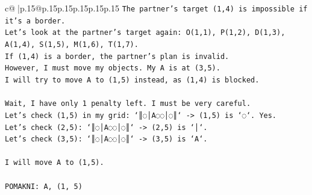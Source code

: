 \documentclass{article}
\begin{document}
{\begin{supertabular}{c@{$\;$}|p{.15\linewidth}@{}p{.15\linewidth}p{.15\linewidth}p{.15\linewidth}p{.15\linewidth}p{.15\linewidth}}
{{{\texttt{The partner's target (1,4) is impossible if it's a border.} \\
\texttt{Let's look at the partner's target again: O(1,1), P(1,2), D(1,3), A(1,4), S(1,5), M(1,6), T(1,7).} \\
\texttt{If (1,4) is a border, the partner's plan is invalid.} \\
\texttt{However, I must move my objects. My A is at (3,5).} \\
\texttt{I will try to move A to (1,5) instead, as (1,4) is blocked.} \\
\\ 
\texttt{Wait, I have only 1 penalty left. I must be very careful.} \\
\texttt{Let's check (1,5) in my grid: `║◌│A◌◌│◌║` {-}> (1,5) is `◌`. Yes.} \\
\texttt{Let's check (2,5): `║◌│A◌◌│◌║` {-}> (2,5) is `│`.} \\
\texttt{Let's check (3,5): `║◌│A◌◌│◌║` {-}> (3,5) is `A`.} \\
\\ 
\texttt{I will move A to (1,5).} \\
\\ 
\texttt{POMAKNI: A, (1, 5)} \\
            }
        }
    }
     \\ \\


\end{supertabular}}
\end{document}
